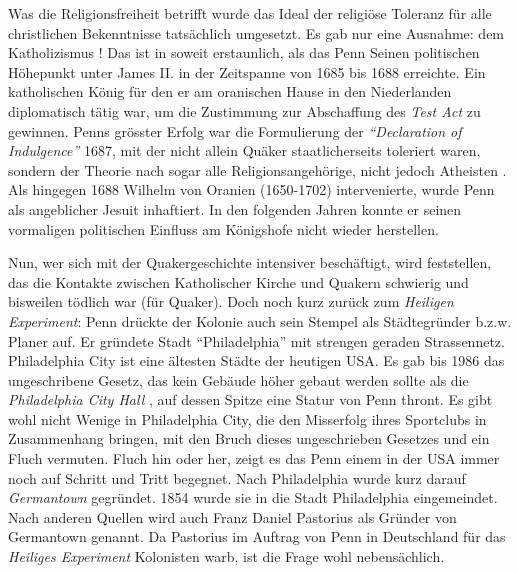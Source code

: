 \medskip

Was die Religionsfreiheit betrifft wurde das Ideal der religiöse Toleranz für
alle
christlichen Bekenntnisse tatsächlich umgesetzt. Es gab nur eine Ausnahme: dem
Katholizismus ! Das ist in soweit erstaunlich, als das Penn
Seinen politischen Höhepunkt unter James II.
 in der Zeitspanne von 1685 bis 1688  erreichte. Ein
katholischen König für den er am oranischen Hause in
den Niederlanden
 diplomatisch tätig war, um die Zustimmung zur
Abschaffung des \textit{Test Act} zu gewinnen. Penns grösster
Erfolg war die Formulierung
der \textit{"`Declaration of Indulgence"'} 1687, mit der nicht allein Quäker
staatlicherseits toleriert waren, sondern der Theorie nach sogar alle
Religionsangehörige, nicht jedoch Atheisten . Als
hingegen 1688 Wilhelm von Oranien (1650-1702)  intervenierte, wurde Penn als angeblicher
Jesuit inhaftiert. In den folgenden Jahren konnte er
seinen vormaligen politischen Einfluss am Königshofe  nicht
wieder herstellen.

\medskip

Nun, wer sich mit der Quakergeschichte intensiver beschäftigt, wird feststellen,
das die Kontakte zwischen Katholischer Kirche und Quakern schwierig und
bisweilen tödlich war (für Quaker). Doch noch kurz zurück zum \textit{Heiligen
Experiment}: Penn drückte der Kolonie auch sein Stempel als Städtegründer
b.z.w. Planer auf. Er gründete Stadt "`Philadelphia"' mit strengen geraden
Strassennetz. Philadelphia City ist eine ältesten Städte der heutigen USA. Es gab
bis 1986 das ungeschribene Gesetz, das kein Gebäude höher gebaut werden sollte
als die \textit{Philadelphia City Hall} ,
auf dessen Spitze eine Statur von Penn thront. Es gibt wohl nicht Wenige in
Philadelphia City, die den Misserfolg ihres Sportclubs in Zusammenhang bringen,
mit den Bruch dieses ungeschrieben Gesetzes und ein Fluch vermuten. Fluch hin
oder her, zeigt es das Penn einem in der USA immer noch auf Schritt und Tritt
begegnet. Nach Philadelphia wurde kurz darauf  \textit{Germantown}
 gegründet. 1854 wurde sie in die Stadt Philadelphia
eingemeindet. Nach anderen Quellen wird auch Franz Daniel Pastorius als Gründer
von Germantown genannt. Da Pastorius im Auftrag von Penn in Deutschland für das
\textit{Heiliges Experiment} Kolonisten warb, ist die Frage wohl nebensächlich.

